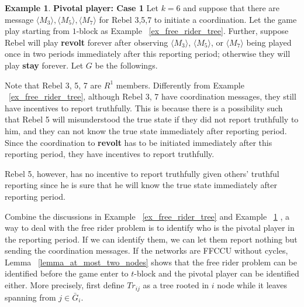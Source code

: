 \documentclass[12pt,letter]{article}
\theoremstyle{definition}
\newtheorem{example}{Example}[section]
\theoremstyle{remark}
\theoremstyle{claim}
\begin{document}
\begin{example} \label{ex_pivotal_1}\textbf{Pivotal player: Case 1}
Let $k=6$ and suppose that there are message $\langle M_3 \rangle,\langle M_5 \rangle, \langle M_7 \rangle$ for Rebel 3,5,7 to initiate a coordination. Let the game play starting from $1$-block as Example ~\ref{ex_free_rider_tree}. Further, suppose Rebel will play \textbf{revolt} forever after observing $\langle M_3 \rangle$, $\langle M_5 \rangle$, or $\langle M_7 \rangle$ being played once in two periods immediately after this reporting period; otherwise they will play \textbf{stay} forever. Let $G$ be the followings.
\begin{center}
\end{center}

Note that Rebel 3, 5, 7 are $R^1$ members. Differently from Example ~\ref{ex_free_rider_tree}, although Rebel 3, 7 have coordination messages, they still have incentives to report truthfully. This is because there is a possibility such that Rebel 5 will misunderstood the true state if they did not report truthfully to him, and they can not know the true state immediately after reporting period. Since the coordination to \textbf{revolt} has to be initiated immediately after this reporting period, they have incentives to report truthfully.

Rebel 5, however, has no incentive to report truthfully given others' truthful reporting since he is sure that he will know the true state immediately after reporting period.
\end{example}
   
Combine the discussions in Example ~\ref{ex_free_rider_tree} and Example ~\ref{ex_pivotal_1} , a way to deal with the free rider problem is to identify who is the pivotal player in the reporting period. If we can identify them, we can let them report nothing but sending the coordination messages. If the networks are FFCCU without cycles, Lemma ~\ref{lemma_at_most_two_nodes} shows that the free rider problem can be identified before the game enter to $t$-block and the pivotal player can be identified either. More precisely, first define $Tr_{ij}$ as a tree rooted in $i$ node while it leaves spanning from $j\in \bar{G}_i$.
\end{document}
